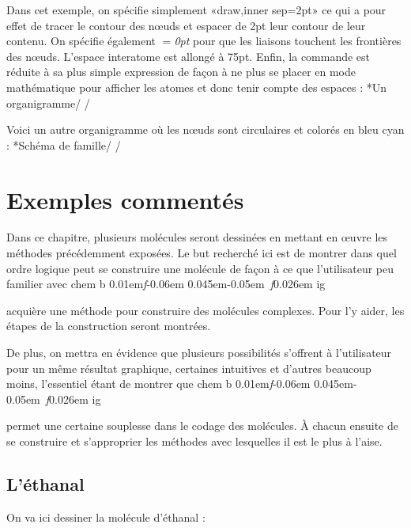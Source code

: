 \documentclass[10pt,french]{article}
\makeatletter
\newcommand\make@car@active[1]{%
	\catcode`#1\active
	\begingroup
		\lccode`\~`#1\relax
		\lowercase{\endgroup\def~}%
}
\newif\if@exstar
\newcommand\exemple{%
	\begingroup
	\parskip\z@
	\@makeother\;\@makeother\!\@makeother\?\@makeother\:%
	\@ifstar{\@exstartrue\exemple@}{\@exstarfalse\exemple@}}
\newcommand\exemple@[2][65]{%
	\medbreak\noindent
	\begingroup
		\let\do\@makeother\dospecials
		\make@car@active\ { {}}%
		\make@car@active\^^M{\par\leavevmode}%
		\make@car@active\^^I{\space\space}%
		\make@car@active\,{\leavevmode\kern\z@\string,}%
		\make@car@active\-{\leavevmode\kern\z@\string-}%
		\make@car@active\>{\leavevmode\kern\z@\string>}%
		\make@car@active\<{\leavevmode\kern\z@\string<}%
		\exemple@@{#1}{#2}%
}
\newcommand\exemple@@[3]{%
	\def\@tempa##1#3{\exemple@@@{#1}{#2}{##1}}%
	\@tempa
}
\newcommand\exemple@@@[3]{%
	\xdef\the@code{#3}%
	\endgroup
	\if@exstar
		\begingroup
			\fboxrule0.4pt
			\let\breakboxparindent\z@
			\def\bkvz@bottom{\hrule\@height\fboxrule}%
			\let\bkvz@before@breakbox\relax
			\def\bkvz@set@linewidth{\advance\linewidth\dimexpr-2\fboxrule-2\fboxsep}%
			\def\bkvz@left{\vrule\@width\fboxrule\hskip\fboxsep}%
			\def\bkvz@right{\hskip\fboxsep\vrule\@width\fboxrule}%
			\def\bkvz@top{\hbox to \hsize{%
				\vrule\@width\fboxrule\@height\fboxrule
				\leaders\bkvz@bottom\hfill
				\sffamily
				\fboxsep\z@
				\colorbox{black}{\kern0.25em\color{white}\footnotesize\lower0.5ex\hbox{\strut#2}\kern0.25em}%
				\leaders\bkvz@bottom\hfill
				\vrule\@width\fboxrule\@height\fboxrule}}%
			\breakbox
				\kern.5ex\relax
				\ttfamily\footnotesize\the@code\par
				\normalfont
				\kern3pt
				\hrule height0.1pt width\linewidth depth0.1pt
				\vskip5pt
				\rightskip0pt plus 1fill
				\everypar{{\color{lightgray}\rlap{\vrule height0.1pt width\linewidth depth0.1pt}}\hskip0pt plus 1fill}%
				\newlinechar`\^^M\everyeof{\noexpand}\scantokens{#3}\par
			\endbreakbox
		\endgroup
	\else
		\vskip0.5ex
		\boxput*(0,1)
			{\fboxsep\z@
			\hbox{\sffamily\colorbox{black}{\leavevmode\kern0.25em{\color{white}\footnotesize\strut#2}\kern0.25em}}%
			}%
			{\fboxsep5pt
			\fbox{%
				$\vcenter{\hsize\dimexpr0.#1\linewidth-\fboxsep-\fboxrule\relax
					\kern5pt\parskip0pt \ttfamily\footnotesize\the@code}%
				\vcenter{\kern5pt\hsize\dimexpr\linewidth-0.#1\linewidth-\fboxsep-\fboxrule\relax
					\everypar{{\color{lightgray}\rlap{\vrule height0.1pt width\dimexpr\linewidth-0.#1\linewidth-\fboxsep-\fboxrule depth0.1pt}}}%
					\footnotesize\newlinechar`\^^M\everyeof{\noexpand}\scantokens{#3}}$%
				}%
			}%
	\fi
	\medbreak
	\endgroup
}
\newcommand\falseverb[1]{{\ttfamily\detokenize\expandafter{\string#1}}}
\let\do\@makeother\dospecials
\DeclareRobustCommand\CF{%
	\textsf{%
		chem%
		\if\string b\detokenize\expandafter{\f@series}%
			\lower0.01em\hbox{\itshape f}\kern-0.06em
		\else
			\lower0.045em\hbox{\kern-0.05em \itshape f}\kern0.026em
		\fi ig%
		}%
		\xspace
}
\newcommand*\CFkey[1]{{\color{teal}\texttt{\detokenize{#1}}}}
\newcommand*\CFval[1]{{\color{teal}\textlangle\textit{#1}\textrangle}}
\newcommand*\CFkv[2]{\CFkey{#1}{\color{teal}${}={}$}\CFval{#2}}
\makeatother
\begin{document}
Dans cet exemple, on spécifie simplement «draw,inner sep=2pt» ce qui a pour effet de tracer le contour des nœuds et espacer de 2pt leur contour de leur contenu. On spécifie également \CFkv{bond offset}{0pt} pour que les liaisons touchent les frontières des nœuds. L'espace interatome est allongé à 75pt. Enfin, la commande \falseverb{\printatom} est réduite à sa plus simple expression de façon à ne plus se placer en mode mathématique pour afficher les atomes et donc tenir compte des espaces :
\exemple*{Un organigramme}/
\renewcommand\printatom[1]{#1}
/

Voici un autre organigramme où les nœuds sont circulaires et colorés en bleu cyan :
\exemple*{Schéma de famille}/
\renewcommand\printatom[1]{\textsf{#1}}
/

\section{Exemples commentés}\label{exemples.commentes}
Dans ce chapitre, plusieurs molécules seront dessinées en mettant en œuvre les méthodes précédemment exposées. Le but recherché ici est de montrer dans quel ordre logique peut se construire une molécule de façon à ce que l'utilisateur peu familier avec \CF acquière une méthode pour construire des molécules complexes. Pour l'y aider, les étapes de la construction seront montrées.

De plus, on mettra en évidence que plusieurs possibilités s'offrent à l'utilisateur pour un même résultat graphique, certaines intuitives et d'autres beaucoup moins, l'essentiel étant de montrer que \CF permet une certaine souplesse dans le codage des molécules. À chacun ensuite de se construire et s'approprier les méthodes avec lesquelles il est le plus à l'aise.

\subsection{L'éthanal}
On va ici dessiner la molécule d'éthanal : 
\end{document}
